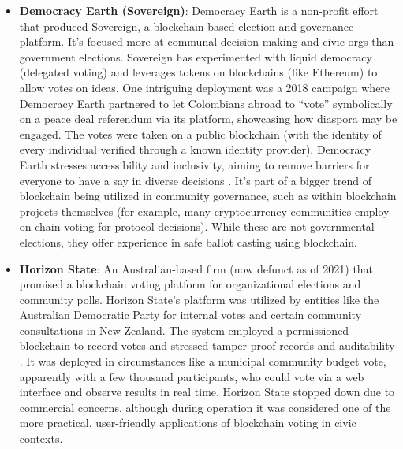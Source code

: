 \documentclass[a4paper,10pt]{report}
\begin{document}
\begin{itemize}
  \item \textbf{Democracy Earth (Sovereign)}: Democracy Earth is a non-profit effort that produced Sovereign, a blockchain-based election and governance platform.  It’s focused more at communal decision-making and civic orgs than government elections.  Sovereign has experimented with liquid democracy (delegated voting) and leverages tokens on blockchains (like Ethereum) to allow votes on ideas.  One intriguing deployment was a 2018 campaign where Democracy Earth partnered to let Colombians abroad to “vote” symbolically on a peace deal referendum via its platform, showcasing how diaspora may be engaged.  The votes were taken on a public blockchain (with the identity of every individual verified through a known identity provider).  Democracy Earth stresses accessibility and inclusivity, aiming to remove barriers for everyone to have a say in diverse decisions \cite{democracyearth2018}.  It’s part of a bigger trend of blockchain being utilized in community governance, such as within blockchain projects themselves (for example, many cryptocurrency communities employ on-chain voting for protocol decisions).  While these are not governmental elections, they offer experience in safe ballot casting using blockchain.

  \item \textbf{Horizon State}: An Australian-based firm (now defunct as of 2021) that promised a blockchain voting platform for organizational elections and community polls.  Horizon State’s platform was utilized by entities like the Australian Democratic Party for internal votes and certain community consultations in New Zealand.  The system employed a permissioned blockchain to record votes and stressed tamper-proof records and auditability \cite{horizonstate2020}.  It was deployed in circumstances like a municipal community budget vote, apparently with a few thousand participants, who could vote via a web interface and observe results in real time.  Horizon State stopped down due to commercial concerns, although during operation it was considered one of the more practical, user-friendly applications of blockchain voting in civic contexts.


\end{itemize}
\end{document}
